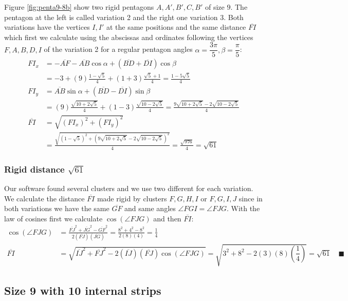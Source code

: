 \documentclass[11pt]{article}
\begin{document}
Figure \ref{fig:penta9-8b} show two rigid pentagons $A,A',B',C,B'$ of size $9$. The pentagon at the left is called variation 2 and the right one variation 3. Both variations have the vertices $I,I'$ at the same positions and the same distance $\overline{FI}$ which first we calculate using the abscissas and ordinates following the vertices $F,A,B,D,I$ of the variation 2 for a regular pentagon angles $\alpha=\dfrac{3\pi}5, \beta=\dfrac{\pi}5$:
\begin{align}
FI_x &= -\overline{AF} - \overline{AB}\cos\alpha + (\overline{BD} + \overline{DI})\cos\beta\nonumber\\
 &= -3 + (9)\frac{1-\sqrt5}4 + (1+3)\frac{\sqrt5+1}4 = \frac{1-5\sqrt5}4\\
FI_y &= \overline{AB}\sin\alpha + (\overline{BD}-\overline{DI})\sin\beta\nonumber\\
 &= (9)\frac{\sqrt{10+2\sqrt5}}4 + (1-3)\frac{\sqrt{10-2\sqrt5}}4
 = \frac{9\sqrt{10+2\sqrt5} - 2\sqrt{10-2\sqrt5}}4\\
\overline{FI} &= \sqrt{(FI_x)^2 + (FI_y)^2}\nonumber\\
 &= \frac{\sqrt{(1-\sqrt5)^2 + (9\sqrt{10+2\sqrt5} - 2\sqrt{10-2\sqrt5})^2}}4
 = \frac{\sqrt{976}}4 = \sqrt{61}
\end{align}

\subsubsection{Rigid distance $\sqrt{61}$}

Our software found several clusters and we use two different for each variation. We  calculate the distance $\overline{FI}$ made rigid by clusters $F,G,H,I$ or $F,G,I,J$ since in both variations we have the same $\overline{GF}$ and same angles $\angle{FGI}=\angle{FJG}$. With the law of cosines first we calculate $\cos(\angle{FJG})$ and then $\overline{FI}$:
\begin{align}
\cos(\angle{FJG}) &= \frac{\overline{FJ}^2 + \overline{JG}^2 - \overline{GF}^2}
 {2(\overline{FJ})(\overline{JG})}
 = \frac{8^2 + 4^2 - 8^2}{2(8)(4)} = \frac{1}4\nonumber\\
\overline{FI} &= \sqrt{\overline{IJ}^2 + \overline{FJ}^2 
 - 2(\overline{IJ})(\overline{FJ})\cos(\angle{FJG})}
 = \sqrt{3^2 + 8^2 - 2(3)(8)\left(\dfrac{1}4\right)} = \sqrt{61} \quad\blacksquare
\end{align}

\subsection{Size 9 with 10 internal strips}
\end{document}
